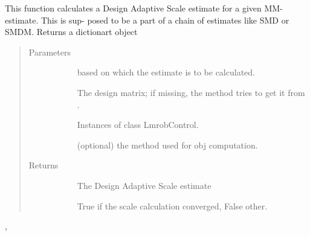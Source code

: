 \documentclass[letterpaper,10pt,english]{sphinxmanual}
\begin{document}
\begin{fulllineitems}
\label{\detokenize{_modules/lmrob:lmrob.lmrob__D__fit}}
This function calculates a Design Adaptive Scale estimate for a given MM-estimate. This is sup-
posed to be a part of a chain of estimates like SMD or SMDM. Returns a dictionart object
\begin{quote}\begin{description}
\item[{Parameters}] \leavevmode\begin{description}
\item[{}] \leavevmode
based on which the estimate is to be calculated.

\item[{}] \leavevmode
The design matrix; if missing, the method tries to get it from .

\item[{}] \leavevmode
Instances of class LmrobControl.

\item[{}] \leavevmode
(optional) the method used for obj computation.

\end{description}

\item[{Returns}] \leavevmode\begin{description}
\item[{}] \leavevmode
The Design Adaptive Scale estimate

\item[{}] \leavevmode
True if the scale calculation converged, False other.

\end{description}

\end{description}\end{quote}




{\hyperref[\detokenize{_modules/lmrob:lmrob.lmrob_fit}]{}}, {\hyperref[\detokenize{_modules/lmrob:module-lmrob}]{}}



\end{fulllineitems}
\end{document}
